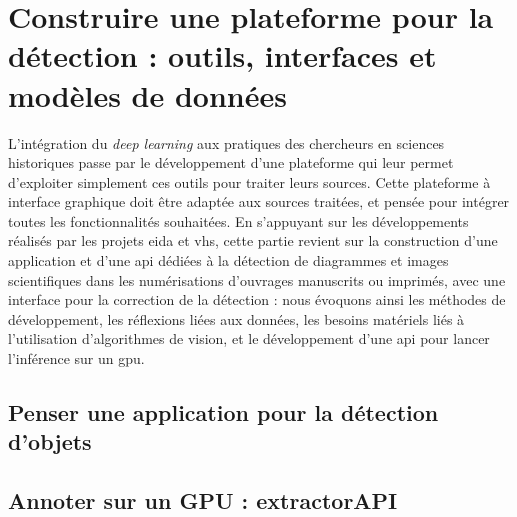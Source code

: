 \documentclass[a4paper,12pt,twoside]{book}
\newcommand{\gpu}{\gls{gpu}\xspace}
\newcommand{\api}{\gls{api}\xspace}
\newcommand{\eida}{\gls{eida}\xspace}
\newcommand{\vhs}{\gls{vhs}\xspace}
\begin{document}
        \chapter[Construire une plateforme pour la détection]{Construire une plateforme pour la détection : outils, interfaces et modèles de données}
        
        L'intégration du \textit{deep learning} aux pratiques des chercheurs en sciences historiques passe par le développement d'une plateforme qui leur permet d'exploiter simplement ces outils pour traiter leurs sources. Cette plateforme à interface graphique doit être adaptée aux sources traitées, et pensée pour intégrer toutes les fonctionnalités souhaitées. En s'appuyant sur les développements réalisés par les projets \eida et \vhs, cette partie revient sur la construction d'une application  et d'une \api dédiées à la détection de diagrammes et images scientifiques dans les numérisations d'ouvrages manuscrits ou imprimés, avec une interface pour la correction de la détection : nous évoquons ainsi les méthodes de développement, les réflexions liées aux données, les besoins matériels liés à l'utilisation d'algorithmes de vision, et le développement d'une \api pour lancer l'inférence sur un \gpu. 
         
                \section{Penser une application pour la détection d'objets}
                    
            
                \section{Annoter sur un GPU : extractorAPI}
                    
        \\
        
\end{document}
